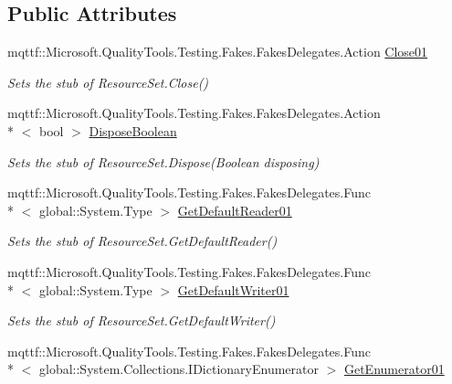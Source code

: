 \subsection*{Public Attributes}
\begin{DoxyCompactItemize}
\item 
mqttf\-::\-Microsoft.\-Quality\-Tools.\-Testing.\-Fakes.\-Fakes\-Delegates.\-Action \hyperlink{class_system_1_1_resources_1_1_fakes_1_1_stub_resource_set_acad6465d220a7e170817f928a197b244}{Close01}
\begin{DoxyCompactList}\small\item\em Sets the stub of Resource\-Set.\-Close()\end{DoxyCompactList}\item 
mqttf\-::\-Microsoft.\-Quality\-Tools.\-Testing.\-Fakes.\-Fakes\-Delegates.\-Action\\*
$<$ bool $>$ \hyperlink{class_system_1_1_resources_1_1_fakes_1_1_stub_resource_set_af24c4abbd4d1d2ae59791adb78cf73a0}{Dispose\-Boolean}
\begin{DoxyCompactList}\small\item\em Sets the stub of Resource\-Set.\-Dispose(\-Boolean disposing)\end{DoxyCompactList}\item 
mqttf\-::\-Microsoft.\-Quality\-Tools.\-Testing.\-Fakes.\-Fakes\-Delegates.\-Func\\*
$<$ global\-::\-System.\-Type $>$ \hyperlink{class_system_1_1_resources_1_1_fakes_1_1_stub_resource_set_a36053e7cc669f73a9da012fa38be4bdf}{Get\-Default\-Reader01}
\begin{DoxyCompactList}\small\item\em Sets the stub of Resource\-Set.\-Get\-Default\-Reader()\end{DoxyCompactList}\item 
mqttf\-::\-Microsoft.\-Quality\-Tools.\-Testing.\-Fakes.\-Fakes\-Delegates.\-Func\\*
$<$ global\-::\-System.\-Type $>$ \hyperlink{class_system_1_1_resources_1_1_fakes_1_1_stub_resource_set_a0bd8041c45fda542738d739f8f7b20ef}{Get\-Default\-Writer01}
\begin{DoxyCompactList}\small\item\em Sets the stub of Resource\-Set.\-Get\-Default\-Writer()\end{DoxyCompactList}\item 
mqttf\-::\-Microsoft.\-Quality\-Tools.\-Testing.\-Fakes.\-Fakes\-Delegates.\-Func\\*
$<$ global\-::\-System.\-Collections.\-I\-Dictionary\-Enumerator $>$ \hyperlink{class_system_1_1_resources_1_1_fakes_1_1_stub_resource_set_aeccbfaf9c015875fa6a8853de8a50ba5}{Get\-Enumerator01}

\end{DoxyCompactItemize}
